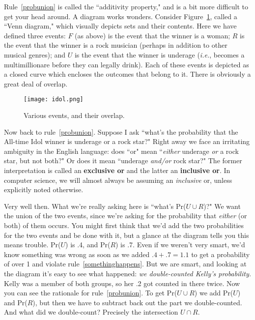 Rule~\ref{probunion} is called the ``additivity property," and is a bit
more difficult to get your head around. A diagram works wonders. Consider
Figure~\ref{venn}, called a ``Venn diagram," which visually depicts sets
and their contents. Here we have defined three events: $F$ (as above) is
the event that the winner is a woman; $R$ is the event that the winner is a
rock musician (perhaps in addition to other musical genres); and $U$ is the
event that the winner is underage (\textit{i.e.}, becomes a multimillionare
before they can legally drink). Each of these events is depicted as a
closed curve which encloses the outcomes that belong to it. There is
obviously a great deal of overlap.

\begin{figure}[ht]
\centering
\texttt{[image: idol.png]}
\caption{Various events, and their overlap.}
\label{venn}
\end{figure}

Now back to rule~\ref{probunion}. Suppose I ask ``what's the probability
that the All-time Idol winner is underage or a rock star?" Right
away we face an irritating ambiguity in the English language: does ``or"
mean ``\textit{either} underage \textit{or} a rock star, but not both?" Or
does it mean ``underage \textit{and/or} rock star?" The former
interpretation is called an \textbf{exclusive or} and the latter an
\textbf{inclusive or}. In computer science, we will almost always be
assuming an \textit{inclusive} or, unless explicitly noted otherwise.

Very well then. What we're really asking here is ``what's Pr($U \cup R$)?"
We want the union of the two events, since we're asking for the probability
that \textit{either} (or both) of them occurs. You might first think that
we'd add the two probabilities for the two events and be done with it, but
a glance at the diagram tells you this means trouble. Pr($U$) is .4, and
Pr($R$) is .7. Even if we weren't very smart, we'd know something was wrong
as soon as we added $.4 + .7 = 1.1$ to get a probability of over 1 and
violate rule~\ref{somethinghappens}. But we are smart, and looking at the
diagram it's easy to see what happened: \textit{we double-counted Kelly's
probability.} Kelly was a member of both groups, so her .2 got counted in
there twice. Now you can see the rationale for rule~\ref{probunion}. To get
Pr($U \cup R$) we add Pr($U$) and Pr($R$), but then we have to subtract
back out the part we double-counted. And what did we double-count?
Precisely the intersection $U \cap R$.

